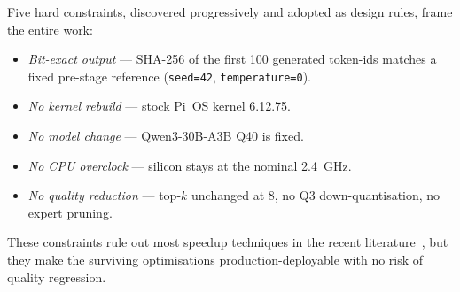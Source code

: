 \documentclass[10pt,a4paper]{article}
\begin{document}
\noindent Five hard constraints, discovered progressively and adopted as design rules, frame the entire work:
\begin{itemize}
  \item \emph{Bit-exact output} --- SHA-256 of the first 100 generated token-ids matches a fixed pre-stage reference (\texttt{seed=42}, \texttt{temperature=0}).
  \item \emph{No kernel rebuild} --- stock Pi~OS kernel 6.12.75.
  \item \emph{No model change} --- Qwen3-30B-A3B Q40 is fixed.
  \item \emph{No CPU overclock} --- silicon stays at the nominal 2.4~GHz.
  \item \emph{No quality reduction} --- top-$k$ unchanged at 8, no Q3 down-quantisation, no expert pruning.
\end{itemize}
\noindent These constraints rule out most speedup techniques in the recent literature~\cite{li2025prima,halo2026}, but they make the surviving optimisations production-deployable with no risk of quality regression.
\end{document}
